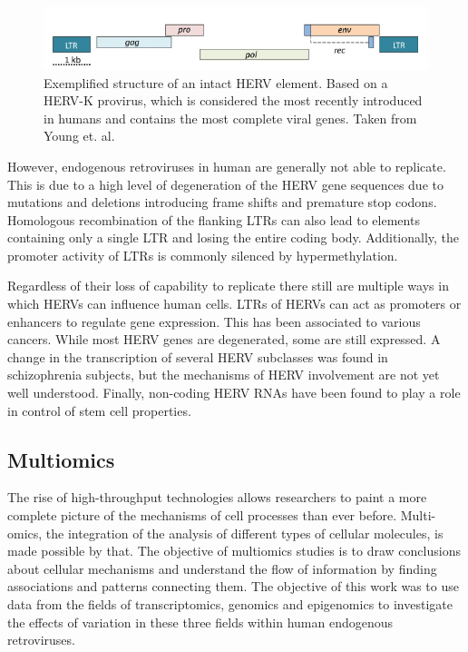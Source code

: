 \documentclass[a4paper,12pt,twoside,openright]{article}
\begin{document}
\begin{figure}[b]
	\includegraphics[scale = 0.92, keepaspectratio = true]{../figures/herv_structure_example}  
	\caption{Exemplified structure of an intact HERV element. Based on a HERV-K provirus, which is considered the most recently introduced in humans and contains the most complete viral genes. Taken from Young et. al. \cite{BIES:BIES201300049}}
    \label{fig:herv.structure.example}
\end{figure}

However, endogenous retroviruses in human are generally not able to replicate. This is due to a high level of degeneration of the HERV gene sequences due to mutations and deletions introducing frame shifts and premature stop codons. Homologous recombination of the flanking LTRs can also lead to elements containing only a single LTR and losing the entire coding body\cite{10.1146/annurev.genom.7.080505.115700}. Additionally, the promoter activity of LTRs is commonly silenced by hypermethylation\cite{Smith2013}.

Regardless of their loss of capability to replicate there still are multiple ways in which HERVs can influence human cells. LTRs of HERVs can act as promoters or enhancers to regulate gene expression. This has been associated to various cancers\cite{10.3892/ijmm.2013.1460}. While most HERV genes are degenerated, some are still expressed. A change in the transcription of several HERV subclasses was found in schizophrenia subjects, but the mechanisms of HERV involvement are not yet well understood\cite{10.3389/fpsyt.2015.00183}. Finally, non-coding HERV RNAs have been found to play a role in control of stem cell properties\cite{APM:APM12476}. 

\subsection{Multiomics}
\label{Introduction:Multiomics}
The rise of high-throughput technologies  allows researchers to paint a more complete picture of the mechanisms of cell processes than ever before. Multi-omics, the integration of the analysis of different types of cellular molecules, is made possible by that. The objective of multiomics studies is to draw conclusions about cellular mechanisms and understand the flow of information by finding associations and patterns connecting them\cite{Hasin2017}. The objective of this work was to use data from the fields of transcriptomics, genomics and epigenomics to investigate the effects of variation in these three fields within human endogenous retroviruses.
\end{document}
